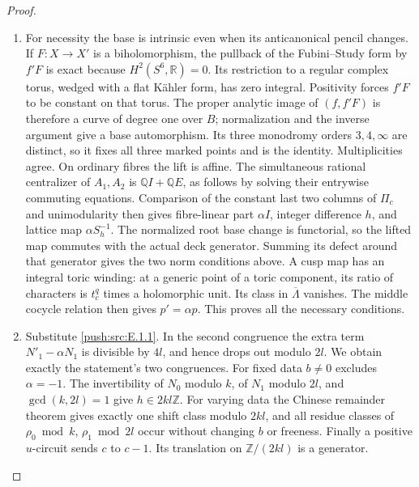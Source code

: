 \begin{proof}
\begin{enumerate}[label=\arabic*.,leftmargin=*]
\item For necessity the base is intrinsic even when its anticanonical
pencil changes.  If $F:X\to X'$ is a biholomorphism, the pullback
of the Fubini--Study form by $f'F$ is exact because
$H^2(S^6,\mathbb R)=0$.  Its restriction to a regular complex torus,
wedged with a flat K\"ahler form, has zero integral.  Positivity
forces $f'F$ to be constant on that torus.  The proper analytic
image of $(f,f'F)$ is therefore a curve of degree one over $B$;
normalization and the inverse argument give a base automorphism.
Its three monodromy orders $3,4,\infty$ are distinct, so it fixes
all three marked points and is the identity.  Multiplicities agree.
On ordinary fibres the lift is affine.  The simultaneous rational
centralizer of $A_1,A_2$ is $\mathbb Q I+\mathbb Q E$, as follows
by solving their entrywise commuting equations.  Comparison of the
constant last two columns of $\Pi_c$ and unimodularity then gives
fibre-linear part $\alpha I$, integer difference $h$, and lattice
map $\alpha S_h^{-1}$.  The normalized root base change is
functorial, so the lifted map commutes with the actual deck
generator.  Summing its defect around that generator gives the
two norm conditions above.  A cusp map has an integral toric
winding: at a generic point of a toric component, its ratio of
characters is $t_c^q$ times a holomorphic unit.  Its class in
$\overline\Lambda$ vanishes.  The middle cocycle relation then
gives $p'=\alpha p$.  This proves all the necessary conditions.

\item Substitute \ref{push:src:E.1.1}.  In the second congruence the extra term
$N'_1-\alpha N_1$ is divisible by $4l$, and hence drops out
modulo $2l$.  We obtain exactly the statement's two congruences.
For fixed data $b\ne0$ excludes $\alpha=-1$.
The invertibility of $N_0$ modulo $k$, of $N_1$ modulo $2l$, and
$\gcd(k,2l)=1$ give $h\in2kl\mathbb Z$.
For varying data the Chinese remainder theorem gives exactly one
shift class modulo $2kl$, and all residue classes of
$\rho_0\bmod k$, $\rho_1\bmod2l$ occur without changing $b$ or
freeness.  Finally a positive $u$-circuit sends $c$ to $c-1$.
Its translation on $\mathbb Z/(2kl)$ is a generator.
\end{enumerate}
\end{proof}